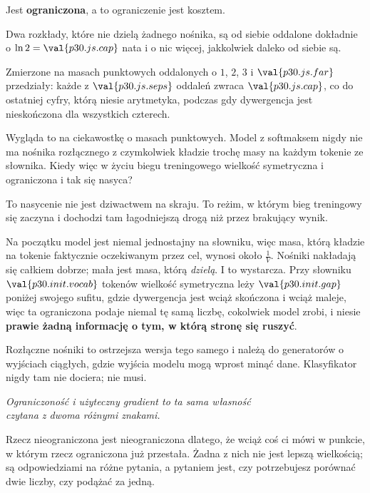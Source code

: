 \begin{fr}
\begin{ansblock}
Jest \textbf{ograniczona}, a to ograniczenie jest kosztem.

Dwa rozkłady, które nie dzielą żadnego nośnika, są od siebie oddalone
dokładnie o $\ln 2 = \val{p30.js.cap}$ nata i o nic więcej, jakkolwiek
daleko od siebie są.
\end{ansblock}

Zmierzone na masach punktowych oddalonych o $1$, $2$, $3$ i
$\val{p30.js.far}$ przedziały: każde z $\val{p30.js.seps}$ oddaleń zwraca
$\val{p30.js.cap}$, co do ostatniej cyfry, którą niesie arytmetyka, podczas
gdy dywergencja jest nieskończona dla wszystkich czterech.

Wygląda to na ciekawostkę o masach punktowych. Model z softmaksem nigdy nie
ma nośnika rozłącznego z czymkolwiek \dash{} kładzie trochę masy na każdym
tokenie ze słownika. Kiedy więc w życiu biegu treningowego wielkość
symetryczna i ograniczona i tak się nasyca?
\dotline
\nextframe
\end{fr}

\begin{fr}

To nasycenie nie jest dziwactwem na skraju. To reżim, w którym bieg
treningowy się zaczyna \dash{} i dochodzi tam łagodniejszą drogą niż przez
brakujący wynik.

Na początku model jest niemal jednostajny na słowniku, więc masa, którą kładzie
na tokenie faktycznie oczekiwanym przez cel, wynosi około $\frac{1}{V}$.
Nośniki nakładają się całkiem dobrze; mała jest masa, którą \emph{dzielą}. I
to wystarcza. Przy słowniku $\val{p30.init.vocab}$ tokenów wielkość
symetryczna leży $\val{p30.init.gap}$ poniżej swojego sufitu, gdzie
dywergencja jest wciąż skończona i wciąż maleje, więc ta ograniczona podaje
niemal tę samą liczbę, cokolwiek model zrobi, i niesie \textbf{prawie żadną
informację o tym, w którą stronę się ruszyć}.

Rozłączne nośniki to ostrzejsza wersja tego samego i należą do generatorów o
wyjściach ciągłych, gdzie wyjścia modelu mogą wprost minąć dane. Klasyfikator
nigdy tam nie dociera; nie musi.

\begin{center}
\emph{Ograniczoność i użyteczny gradient to ta sama własność\\
czytana z dwoma różnymi znakami.}
\end{center}

Rzecz nieograniczona jest nieograniczona dlatego, że wciąż coś ci mówi w
punkcie, w którym rzecz ograniczona już przestała. Żadna z nich nie jest
lepszą wielkością; są odpowiedziami na różne pytania, a pytaniem jest, czy
potrzebujesz porównać dwie liczby, czy podążać za jedną.
\end{fr}

